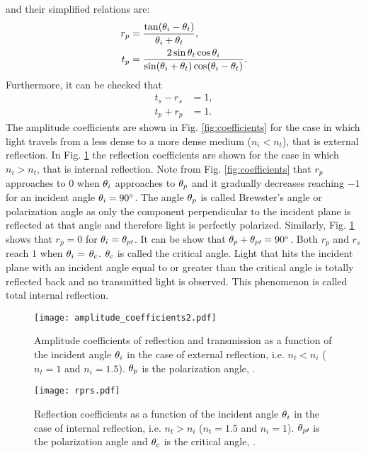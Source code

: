 and their simplified relations are:
\begin{equation} \label{simple_Fresnel}
\begin{split}
r_{p} & =  \frac{\tan(\theta_i-\theta_t)}{\theta_i+\theta_t},\\
t_{p} & = \frac{2\sin \theta_t \cos \theta_i}{\sin(\theta_i+\theta_t)\cos(\theta_i- \theta_t)}.
\end{split}
\end{equation}
Furthermore, it can be checked that
 \begin{equation}
\begin{split}
t_s-r_s &= 1, \\
t_p+r_p &=  1.
\end{split}
\end{equation}
The amplitude coefficients are shown in Fig. \ref{fig:coefficients} for the case in which light travels from a less dense to a more dense medium ($n_i<n_t$), that is external reflection. 
In Fig. \ref{fig:coefficients2} the reflection coefficients are shown for the case in which $n_i>n_t$, that is internal reflection. Note from Fig. \ref{fig:coefficients} that $r_p$ approaches to $0$ when $\theta_i$ approaches to $\theta_p$ and it gradually decreases reaching $-1$ for an incident angle $\theta_i=90^\circ$. The angle $\theta_p$ is called Brewster's angle or polarization angle as only the component perpendicular to the incident plane is reflected at that angle and therefore light is perfectly polarized. Similarly, Fig. \ref{fig:coefficients2} shows that $r_p=0$ for $\theta_i= \theta_{p\prime}$. It can be show that $\theta_p+ \theta_{p\prime}= 90^\circ$. Both $r_p$ and $r_s$ reach $1$ when $\theta_i= $ $\theta_c$. $\theta_c$ is called the critical angle. Light that hits the incident plane with an incident angle equal to or greater than the critical angle is totally reflected back and no transmitted light is observed. This phenomenon is called total internal reflection. 
\begin{figure}[h]
  \begin{minipage}[h]{0.4\textwidth}
    \texttt{[image: amplitude\_coefficients2.pdf]}
    \caption{Amplitude coefficients of reflection and transmission as a function of the incident angle $\theta_i$  in the case of external reflection, i.e. $n_t<n_i$
($n_t = 1$ and $n_i=1.5$). $\theta_p$ is the polarization angle, \cite{hecht1998hecht}.}
    \label{fig:coefficients}
  \end{minipage} \hspace{2.5cm}
  \begin{minipage}[h]{0.4\textwidth}
    \texttt{[image: rprs.pdf]}
    \caption{Reflection coefficients as a function of the incident angle $\theta_i$ in the case of internal reflection, i.e. $n_t>n_i$
($n_t = 1.5$ and $n_i=1$). $\theta_{p\prime}$ is the polarization angle and $\theta_c$ is the critical angle, \cite{hecht1998hecht}.}
   \label{fig:coefficients2}
 \end{minipage}
\end{figure}\\
